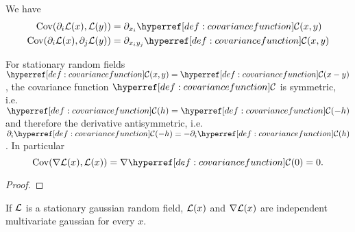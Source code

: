 \begin{lemma}
	\label{lem: covariance of derivative}
	We have
	\begin{align*}
		\Cov(\partial_i\Loss(x), \Loss(y)) &= \partial_{x_i} \C(x,y)\\
		\Cov(\partial_i\Loss(x), \partial_j \Loss(y)) &= \partial_{x_i y_j} \C(x,y)
	\end{align*}
\end{lemma}
\begin{remark}\label{rem: covariance uncorrelated}
	For stationary random fields \(\C(x,y)=\C(x-y)\), the covariance
	function \(\C\) is symmetric, i.e. \(\C(h)=\C(-h)\)
	and therefore the derivative antisymmetric, i.e.
	\(\partial_i\C(-h)=-\partial_i\C(h)\). In particular
	\begin{equation*}
		\Cov(\grad\Loss(x), \Loss(x)) = \grad \C(0)=0.
	\end{equation*}
\end{remark}
\begin{proof}
	
\end{proof}
\begin{corollary}
	If \(\mathcal{L}\) is a stationary gaussian random field, \(\mathcal{L}(x)\) and
	\(\nabla\mathcal{L}(x)\) are independent multivariate gaussian for every \(x\).
\end{corollary}

